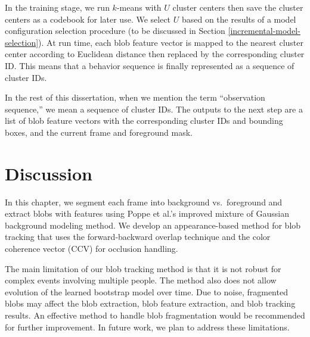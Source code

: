 In the training stage, we run $k$-means with $U$ cluster centers then
save the cluster centers as a codebook for later use. We select $U$
based on the results of a model configuration selection procedure (to
be discussed in Section \ref{incremental-model-selection}). At run
time, each blob feature vector is mapped to the nearest cluster center
according to Euclidean distance then replaced by the corresponding
cluster ID. This means that a behavior sequence is finally represented
as a sequence of cluster IDs.

In the rest of this dissertation, when we mention the term
``observation sequence,'' we mean a sequence of cluster IDs. The
outputs to the next step are a list of blob feature vectors with the
corresponding cluster IDs and bounding boxes, and the current frame
and foreground mask.

\section{Discussion}
\label{sec:blob-discussion}

In this chapter, we segment each frame into background vs.\ foreground
and extract blobs with features using Poppe et al.'s improved mixture
of Gaussian background modeling method. We develop an appearance-based
method for blob tracking that uses the forward-backward overlap
technique and the color coherence vector (CCV) for occlusion handling.

The main limitation of our blob tracking method is that it is not
robust for complex events involving multiple people. The method also
does not allow evolution of the learned bootstrap model over time. 
Due to noise, fragmented blobs may affect the blob extraction, blob
feature extraction, and blob tracking results. An effective method to
handle blob fragmentation would be recommended for further
improvement.  In future work, we plan to address these limitations.

\FloatBarrier




%

